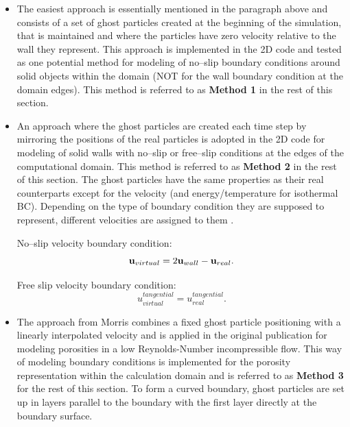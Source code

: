 \documentclass[11pt,a4paper,twoside]{report}
\begin{document}
\begin{itemize}
\item The easiest approach is essentially mentioned in the paragraph above and consists of a set of ghost particles created at the beginning of the simulation, that is maintained and where the particles have zero velocity relative to the wall they represent. This approach is implemented in the 2D code and tested as one potential method for modeling of no--slip boundary conditions around solid objects within the domain (NOT for the wall boundary condition at the domain edges). This method is referred to as {\bf Method 1} in the rest of this section.

 \item An approach where the ghost particles are created each time step by mirroring the positions of the real particles is adopted in the 2D code for modeling of solid walls with no--slip or free--slip conditions at the edges of the computational domain. This method is referred to as {\bf Method 2} in the rest of this section.
The ghost particles have the same properties as their real counterparts
except for the velocity (and energy/temperature for isothermal BC). Depending on the type of boundary condition they are
supposed to represent, different velocities are assigned to them \cite{Hu2006}.

No--slip velocity boundary condition:
\begin{equation}
{\bf u}_{virtual}=2{\bf u}_{wall}-{\bf u}_{real}.
\end{equation}

Free slip velocity boundary condition:
\begin{equation}
u_{virtual}^{tangential}=u_{real}^{tangential}.
\end{equation}


\item The approach from Morris \cite{Morris1997, Zhu1999} combines a fixed ghost particle positioning with a linearly interpolated velocity and is applied in the original publication for modeling porosities in a low Reynolds-Number incompressible flow.
This way of modeling boundary conditions is implemented for the porosity representation within the calculation domain and is referred to as {\bf Method 3} for the rest of this section.
To form a curved boundary, ghost particles are set up in layers parallel to the boundary with the first layer directly at the boundary surface. 


\end{itemize}
\end{document}
